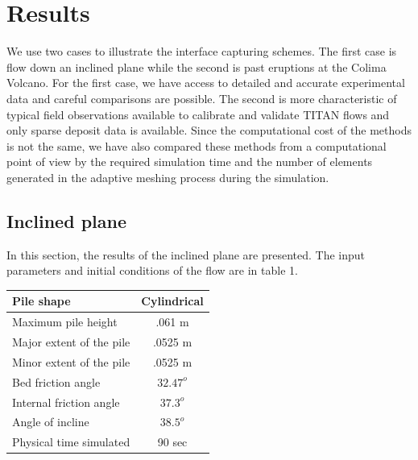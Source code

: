 \documentclass[review]{elsarticle}
\begin{document}
\section{Results} \label{results}
We use two cases to illustrate the  interface capturing schemes. The first case is flow down an inclined plane while the second is past eruptions at the Colima Volcano. 
For the first case, we have access to  detailed and accurate  experimental data and careful comparisons are possible. 
The second is more characteristic of typical field observations available to calibrate and validate TITAN flows and only sparse deposit data is available.
%
Since the computational cost of the methods is not the same, we have also compared these methods from a computational point of view by the required simulation time and the number of elements generated in the adaptive meshing process
during the simulation. 

\subsection{Inclined plane}
In this section, the results of the inclined plane are presented. The input parameters and initial conditions of the flow are in  table 1.
\begin{center}
        \begin{tabular}{|l|c|}
                \hline
                Pile shape       & Cylindrical \\
                \hline
                Maximum pile height       & .061 m \\
                \hline
                Major extent of the pile  & .0525 m \\
                \hline
                Minor extent of the pile  & .0525 m \\
                \hline           
                Bed friction angle        & $32.47^o$ \\
                \hline
                Internal friction angle  & $37.3^o$ \\
                \hline
                Angle of incline          & $38.5^o$ \\
                \hline
                Physical time simulated   &  90 sec \\
                \hline
        \end{tabular}
\end{center}
\end{document}
